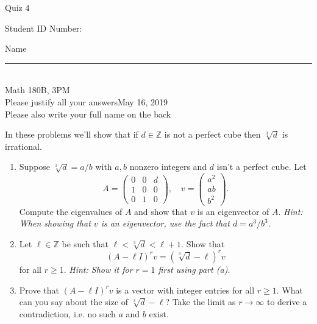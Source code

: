 \documentclass[12pt]{article}
\newcommand{\integers}{\mathbb{Z}}
\begin{document}
\begin{flushleft} 
\centerline{\LARGE{Quiz 4}} 
\vspace{5 mm}
{Student ID Number:}\hfill  
{Name \rule {2 in}{0.01in}}\\
Math 180B, 3PM
\\
{Please justify all your answers}\hfill {May 16, 2019}
\\
{Please also write your full name on the back} 

\medskip
\end{flushleft}

In these problems we'll show that if $d\in \integers$ is not a perfect cube then $\sqrt[3]{d}$ is irrational.
\begin{enumerate}
	\item Suppose $\sqrt[3]{d} = a/b$ with $a,b$ nonzero integers and $d$ isn't a perfect cube. Let
	\[
	A = \begin{pmatrix}
		0 & 0 & d\\
		1 & 0 & 0\\
		0 & 1 & 0
	\end{pmatrix},\quad v = \begin{pmatrix}
		a^2\\
		ab\\
		b^2
	\end{pmatrix}.
	\]
	Compute the eigenvalues of $A$ and show that $v$ is an eigenvector of $A$. \textit{Hint: When showing that $v$ is an eigenvector, use the fact that $d = a^3/b^3$.}
	\vfill

	\item Let $\ell\in \integers$ be such that $\ell < \sqrt[3]{d}<\ell+1$. Show that
	\[
	(A-\ell I)^rv = (\sqrt[3]{d}-\ell)^rv
	\]
	for all $r\geq 1$. \textit{Hint: Show it for $r=1$ first using part (a).}
	\vfill
	\item Prove that $(A-\ell I)^rv$ is a vector with integer entries for all $r\geq 1$. What can you say about the size of $\sqrt[3]{d}-\ell$? Take the limit as $r\to \infty$ to derive a contradiction, i.e. no such $a$ and $b$ exist.
	\vfill
\end{enumerate}

\end{document}
